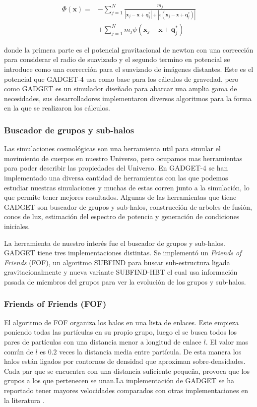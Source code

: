 \begin{align}
    \Phi (\textbf{x}) = &- \sum_{j=1}^{N} \frac{m_j}{|\textbf{x}_j-\textbf{x}+\textbf{q}^*_j| + |\epsilon(\textbf{x}_j-\textbf{x}+\textbf{q}^*_j)|} \nonumber \\
    &+ \sum_{j=1}^{N} m_j \psi (\textbf{x}_j-\textbf{x}+\textbf{q}^*_j) \label{eq:Pot}
\end{align}

\noindent donde la primera parte es el potencial gravitacional de newton con una corrección para considerar el radio de suavizado y el segundo termino en potencial se introduce como una corrección para el suavizado de imágenes distantes. Este es el potencial que GADGET-4 usa como base para los cálculos de gravedad, pero como GADGET es un simulador diseñado para abarcar una amplia gama de necesidades, sus desarrolladores implementaron diversos algoritmos para la forma en la que se realizaron los cálculos.


\subsubsection{Buscador de grupos y sub-halos}

Las simulaciones cosmológicas son una herramienta util para simular el movimiento de cuerpos en nuestro Universo, pero ocupamos mas herramientas para poder describir las propiedades del Universo. En GADGET-4 se han implementado una diversa cantidad de herramientas con las que podemos estudiar nuestras simulaciones y muchas de estas corren junto a la simulación, lo que permite tener mejores resultados. Algunas de las herramientas que tiene GADGET son buscador de grupos y sub-halos, construcción de arboles de fusión, conos de luz, estimación del espectro de potencia y generación de condiciones iniciales. 

La herramienta de nuestro interés fue el buscador de grupos y sub-halos. GADGET tiene tres implementaciones distintas. Se implementó un \textit{Friends of Friends} (FOF), un algoritmo SUBFIND para buscar sub-estructura ligada gravitacionalmente y nueva variante SUBFIND-HBT el cual usa información pasada de miembros del grupos para ver la evolución de los grupos y sub-halos.

\subsubsection{ Friends of Friends (\textbf{FOF}) }
El algoritmo de FOF organiza los halos en una lista de enlaces. Este empieza poniendo todas las partículas en su propio grupo, luego el se busca todos los pares de partículas con una distancia menor a longitud de enlace $l$. El valor mas común de $l$ es $0.2$ veces la distancia media entre partícula. De esta manera los halos están ligados por contornos de densidad que aproximan sobre-densidades. Cada par que se encuentra con una distancia suficiente pequeña, provoca que los grupos a los que pertenecen se unan.La implementación de GADGET se ha reportado tener mayores velocidades comparados con otras implementaciones en la literatura \cite{2021MNRAS.506.2871S}.

